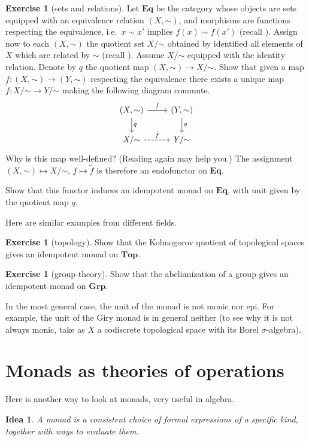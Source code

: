 \documentclass[12pt,oneside]{scrbook}
\def\simord{\mathord\sim}
\numberwithin{equation}{section}
\theoremstyle{plain}
\newtheorem*{idea}{Idea}
\theoremstyle{definition}
\newtheorem{ex}[thm]{Exercise}
\newcommand{\cat}[1]{{\mathbf{#1}}} %
\newcommand{\ar}[2][]{\arrow{#2}{#1}}
\newcommand{\uni}[2][]{\arrow[dashrightarrow]{#2}{#1}} %
\DeclareMathOperator{\1}{\mathbbm{1}}
\DeclareMathOperator{\2}{\mathbbm{2}}
\begin{document}
\begin{ex}[sets and relations]
 Let $\cat{Eq}$ be the category whose objects are sets equipped with an equivalence relation $(X,\simord)$, and morphisms are functions respecting the equivalence, i.e.~$x\sim x'$ implies $f(x)\sim f(x')$ (recall ).   
 Assign now to each $(X,\simord)$ the quotient set $X/\simord$ obtained by identified all elements of $X$ which are related by $\sim$ (recall ). Assume $X/\simord$ equipped with the identity relation. Denote by $q$ the quotient map $(X,\simord)\to X/\simord$.
 Show that given a map $f:(X,\simord)\to(Y,\simord)$ respecting the equivalence there exists a unique map $\tilde{f}:X/\simord\to Y/\simord$ making the following diagram commute.
 $$
 \begin{tikzcd}
  (X,\simord) \ar{d}{q} \ar{r}{f} & (Y,\simord) \ar{d}{q} \\
  X/\simord \uni{r}{\tilde{f}} & Y/\simord
 \end{tikzcd}
 $$
 Why is this map well-defined? (Reading  again may help you.)
 The assignment $(X,\simord)\mapsto X/\simord$, $f\mapsto\tilde{f}$ is therefore an endofunctor on $\cat{Eq}$.
 
 Show that this functor induces an idempotent monad on $\cat{Eq}$, with unit given by the quotient map $q$.
\end{ex}

Here are similar examples from different fields.

\begin{ex}[topology]\label{kolmogorovquotient}
 Show that the Kolmogorov quotient of topological spaces gives an idempotent monad on $\cat{Top}$.
\end{ex}

\begin{ex}[group theory]\label{abelianization}
 Show that the abelianization of a group gives an idempotent monad on $\cat{Grp}$. 
\end{ex}

In the most general case, the unit of the monad is not monic nor epi. For example, the unit of the Giry monad is in general neither (to see why it is not always monic, take as $X$ a codiscrete topological space with its Borel $\sigma$-algebra).


\section{Monads as theories of operations}

Here is another way to look at monads, very useful in algebra.
\begin{idea} 
	A monad is a consistent choice of formal expressions of a specific kind, together with ways to evaluate them. 
\end{idea}
\end{document}

